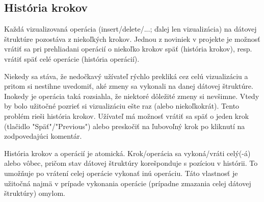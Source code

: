 \subsection{História krokov}
Každá vizualizovaná operácia (insert/delete/...; ďalej len vizualizácia) na dátovej štruktúre pozostáva
z niekoľkých krokov. Jednou z noviniek v projekte je možnosť vrátiť sa pri
prehliadani operácií o niekoľko krokov späť (história krokov), resp. vrátiť späť
celé operácie (história operácií).

Niekedy sa stáva, že nedočkavý užívateľ rýchlo prekliká cez celú vizualizáciu a pritom si nestihne uvedomiť, aké zmeny sa vykonali na danej dátovej
štruktúre. Inokedy je operácia taká rozsiahla, že niektoré dôležité zmeny si
nevšimne. Vtedy by bolo užitočné pozrieť si vizualizáciu ešte raz (alebo
niekoľkokrát). Tento problém rieši história krokov. Užívateľ má možnosť vrátiť
sa späť o jeden krok (tlačidlo "Späť"/"Previous") alebo preskočiť na ľubovoľný
krok po kliknutí na zodpovedajúci komentár.

História krokov a operácií je atomická. Krok/operácia sa vykoná/vráti celý(-á)
alebo vôbec, pričom stav dátovej štruktúry korešponduje s pozíciou v histórii.
To umožňuje po vrátení celej operácie vykonať inú operáciu. Táto vlastnosť je
užitočná najmä v prípade vykonania operácie (prípadne zmazania celej dátovej
štruktúry) omylom.

